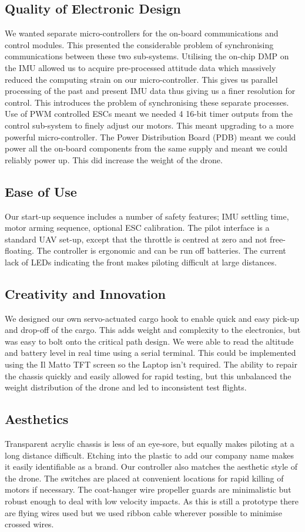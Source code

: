 \documentclass[a4paper,11pt]{article}
\begin{document}
\subsection{Quality of Electronic Design}
We wanted separate micro-controllers for the on-board communications and control modules. This presented the considerable problem of synchronising communications between these two sub-systems. 
Utilising the on-chip DMP on the IMU allowed us to acquire pre-processed attitude data which massively reduced the computing strain on our micro-controller. This gives us parallel processing of the past and present IMU data thus giving us a finer resolution for control. This introduces the problem of synchronising these separate processes. 
Use of PWM controlled ESCs meant we needed 4 16-bit timer outputs from the control sub-system to finely adjust our motors. This meant upgrading to a more powerful micro-controller.
The Power Distribution Board (PDB) meant we could power all the on-board components from the same supply and meant we could reliably power up. This did increase the weight of the drone.
\subsection{Ease of Use}
Our start-up sequence includes a number of safety features; IMU settling time, motor arming sequence, optional ESC calibration. 
The pilot interface is a standard UAV set-up, except that the throttle is centred at zero and not free-floating. 
The controller is ergonomic and can be run off batteries. 
The current lack of LEDs indicating the front makes piloting difficult at large distances.
\subsection{Creativity and Innovation}
We designed our own servo-actuated cargo hook to enable quick and easy pick-up and drop-off of the cargo. This adds weight and complexity to the electronics, but was easy to bolt onto the critical path design.
We were able to read the altitude and battery level in real time using a serial terminal. This could be implemented using the Il Matto TFT screen so the Laptop isn't required.
The ability to repair the chassis quickly and easily allowed for rapid testing, but this unbalanced the weight distribution of the drone and led to inconsistent test flights.
\subsection{Aesthetics}
Transparent acrylic chassis is less of an eye-sore, but equally makes piloting at a long distance difficult. Etching into the plastic to add our company name makes it easily identifiable as a brand.
Our controller also matches the aesthetic style of the drone. The switches are placed at convenient locations for rapid killing of motors if necessary.
The coat-hanger wire propeller guards are minimalistic but robust enough to deal with low velocity impacts.
As this is still a prototype there are flying wires used but we used ribbon cable wherever possible to minimise crossed wires.
\end{document}
